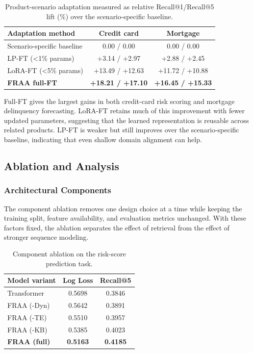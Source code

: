 \documentclass[runningheads]{llncs}
\newcommand{\best}[1]{\textbf{#1}}
\begin{document}
\begin{table}[H]
\centering
\scriptsize
\caption{Product-scenario adaptation measured as relative Recall@1/Recall@5 lift (\%) over the scenario-specific baseline.}
\label{tab:scenario_adaptation}
\begin{tabular}{lcc}
\toprule
\textbf{Adaptation method} & \textbf{Credit card} & \textbf{Mortgage} \\
\midrule
Scenario-specific baseline & 0.00 / 0.00 & 0.00 / 0.00 \\
\rowcolor{tablerowalt}
LP-FT (<1\% params) & +3.14 / +2.97 & +2.88 / +2.45 \\
LoRA-FT (<5\% params) & +13.49 / +12.63 & +11.72 / +10.88 \\
\rowcolor{tablerowalt}
\textbf{FRAA full-FT} & \best{+18.21 / +17.10} & \best{+16.45 / +15.33} \\
\bottomrule
\end{tabular}
\end{table}

Full-FT gives the largest gains in both credit-card risk scoring and mortgage delinquency forecasting. LoRA-FT retains much of this improvement with fewer updated parameters, suggesting that the learned representation is reusable across related products. LP-FT is weaker but still improves over the scenario-specific baseline, indicating that even shallow domain alignment can help.

\subsection{Ablation and Analysis}
\label{sec:ablation}

\subsubsection{Architectural Components}
The component ablation removes one design choice at a time while keeping the training split, feature availability, and evaluation metrics unchanged. With these factors fixed, the ablation separates the effect of retrieval from the effect of stronger sequence modeling.

\begin{table}[H]
\centering
\caption{Component ablation on the risk-score prediction task.}
\label{tab:component_ablation}
\begin{tabular}{lcc}
\toprule
\textbf{Model variant} & \textbf{Log Loss} & \textbf{Recall@5} \\
\midrule
Transformer & 0.5698 & 0.3846 \\
\rowcolor{tablerowalt}
FRAA (-Dyn) & 0.5642 & 0.3891 \\
FRAA (-TE) & 0.5510 & 0.3957 \\
\rowcolor{tablerowalt}
FRAA (-KB) & 0.5385 & 0.4023 \\
\textbf{FRAA (full)} & \best{0.5163} & \best{0.4185} \\
\bottomrule
\end{tabular}
\end{table}
\end{document}
